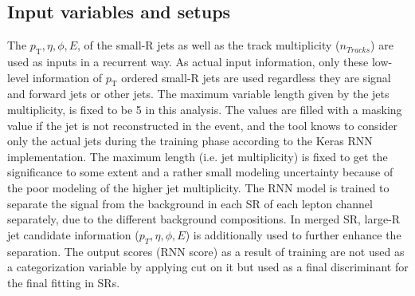 \subsection{Input variables and setups}
The $p_\mathrm{T}, \eta, \phi, E$, of the small-R jets as well as the track multiplicity ($n_{Tracks}$) are used as inputs in a recurrent way. 
As actual input information, only these low-level information of $p_\mathrm{T}$ ordered small-R jets are used regardless they are signal and forward jets or other jets. 
The maximum variable length given by the jets multiplicity, is fixed to be 5 in this analysis. 
The values are filled with a masking value if the jet is not reconstructed in the event, and the tool knows to consider only the actual jets during the training phase according to the Keras RNN implementation. 
The maximum length (i.e. jet multiplicity) is fixed to get the significance to some extent and a rather small modeling uncertainty because of the poor modeling of the higher jet multiplicity.
The RNN model is trained to separate the signal from the background in each SR of each lepton channel separately, due to the different background compositions. 
In merged SR, large-R jet candidate information ($p_T, \eta, \phi, E$) is additionally used to further enhance the separation.
The output scores (RNN score) as a result of training are not used as a categorization variable by applying cut on it but used as a final discriminant for the final fitting in SRs. 
